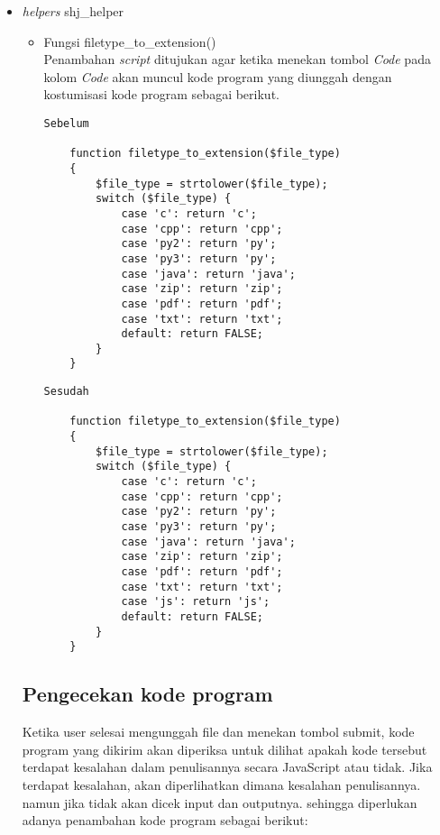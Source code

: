  \begin{itemize}
     \item \textit{helpers} shj\_helper
     \begin{itemize}
        \item Fungsi filetype\_to\_extension()\\  Penambahan \textit{script} ditujukan agar ketika menekan tombol \textit{Code} pada kolom \textit{Code} akan muncul kode program yang diunggah dengan kostumisasi kode program sebagai berikut.
    \begin{lstlisting}[basicstyle=\ttfamily, frame=single,
    columns=fullflexible, breaklines=true, numbers=none]
Sebelum 

	function filetype_to_extension($file_type)
	{
		$file_type = strtolower($file_type);
		switch ($file_type) {
			case 'c': return 'c';
			case 'cpp': return 'cpp';
			case 'py2': return 'py';
			case 'py3': return 'py';
			case 'java': return 'java';
			case 'zip': return 'zip';
			case 'pdf': return 'pdf';
			case 'txt': return 'txt';
			default: return FALSE;
		}
	}
    \end{lstlisting}

         \begin{lstlisting}[basicstyle=\ttfamily, frame=single,
    columns=fullflexible, breaklines=true, numbers=none]
Sesudah

	function filetype_to_extension($file_type)
	{
		$file_type = strtolower($file_type);
		switch ($file_type) {
			case 'c': return 'c';
			case 'cpp': return 'cpp';
			case 'py2': return 'py';
			case 'py3': return 'py';
			case 'java': return 'java';
			case 'zip': return 'zip';
			case 'pdf': return 'pdf';
			case 'txt': return 'txt';
			case 'js': return 'js';
			default: return FALSE;
		}
	}
    \end{lstlisting}
     \end{itemize}
     \subsection{Pengecekan kode program}
     Ketika user selesai mengunggah file dan menekan tombol submit, kode program yang dikirim akan diperiksa untuk dilihat apakah kode tersebut terdapat kesalahan dalam penulisannya secara JavaScript atau tidak. Jika terdapat kesalahan, akan diperlihatkan dimana kesalahan penulisannya. namun jika tidak akan dicek input dan outputnya. sehingga diperlukan adanya penambahan kode program sebagai berikut: 
     

\end{itemize}
